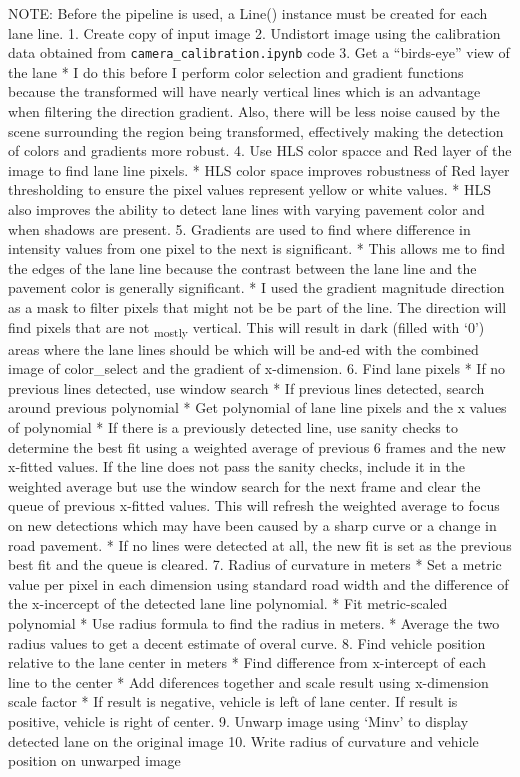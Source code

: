 \documentclass[11pt]{article}
\begin{document}
NOTE: Before the pipeline is used, a Line() instance must be created for
each lane line. 1. Create copy of input image 2. Undistort image using
the calibration data obtained from \texttt{camera\_calibration.ipynb}
code 3. Get a ``birds-eye'' view of the lane * I do this before I
perform color selection and gradient functions because the transformed
will have nearly vertical lines which is an advantage when filtering the
direction gradient. Also, there will be less noise caused by the scene
surrounding the region being transformed, effectively making the
detection of colors and gradients more robust. 4. Use HLS color spacce
and Red layer of the image to find lane line pixels. * HLS color space
improves robustness of Red layer thresholding to ensure the pixel values
represent yellow or white values. * HLS also improves the ability to
detect lane lines with varying pavement color and when shadows are
present. 5. Gradients are used to find where difference in intensity
values from one pixel to the next is significant. * This allows me to
find the edges of the lane line because the contrast between the lane
line and the pavement color is generally significant. * I used the
gradient magnitude direction as a mask to filter pixels that might not
be be part of the line. The direction will find pixels that are not
\textsubscript{mostly} vertical. This will result in dark (filled with
`0') areas where the lane lines should be which will be and-ed with the
combined image of color\_select and the gradient of x-dimension. 6. Find
lane pixels * If no previous lines detected, use window search * If
previous lines detected, search around previous polynomial * Get
polynomial of lane line pixels and the x values of polynomial * If there
is a previously detected line, use sanity checks to determine the best
fit using a weighted average of previous 6 frames and the new x-fitted
values. If the line does not pass the sanity checks, include it in the
weighted average but use the window search for the next frame and clear
the queue of previous x-fitted values. This will refresh the weighted
average to focus on new detections which may have been caused by a sharp
curve or a change in road pavement. * If no lines were detected at all,
the new fit is set as the previous best fit and the queue is cleared. 7.
Radius of curvature in meters * Set a metric value per pixel in each
dimension using standard road width and the difference of the
x-incercept of the detected lane line polynomial. * Fit metric-scaled
polynomial * Use radius formula to find the radius in meters. * Average
the two radius values to get a decent estimate of overal curve. 8. Find
vehicle position relative to the lane center in meters * Find difference
from x-intercept of each line to the center * Add diferences together
and scale result using x-dimension scale factor * If result is negative,
vehicle is left of lane center. If result is positive, vehicle is right
of center. 9. Unwarp image using `Minv' to display detected lane on the
original image 10. Write radius of curvature and vehicle position on
unwarped image
\end{document}
